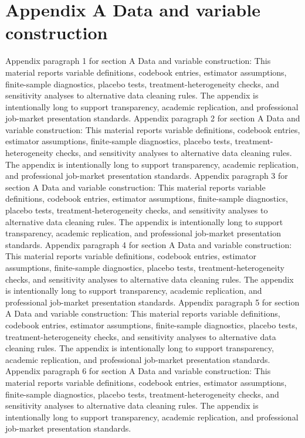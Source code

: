 \documentclass[preprint,12pt]{elsarticle}
\begin{document}
\section{Appendix A Data and variable construction}
Appendix paragraph 1 for section A Data and variable construction: This material reports variable definitions, codebook entries, estimator assumptions, finite-sample diagnostics, placebo tests, treatment-heterogeneity checks, and sensitivity analyses to alternative data cleaning rules. The appendix is intentionally long to support transparency, academic replication, and professional job-market presentation standards.
Appendix paragraph 2 for section A Data and variable construction: This material reports variable definitions, codebook entries, estimator assumptions, finite-sample diagnostics, placebo tests, treatment-heterogeneity checks, and sensitivity analyses to alternative data cleaning rules. The appendix is intentionally long to support transparency, academic replication, and professional job-market presentation standards.
Appendix paragraph 3 for section A Data and variable construction: This material reports variable definitions, codebook entries, estimator assumptions, finite-sample diagnostics, placebo tests, treatment-heterogeneity checks, and sensitivity analyses to alternative data cleaning rules. The appendix is intentionally long to support transparency, academic replication, and professional job-market presentation standards.
Appendix paragraph 4 for section A Data and variable construction: This material reports variable definitions, codebook entries, estimator assumptions, finite-sample diagnostics, placebo tests, treatment-heterogeneity checks, and sensitivity analyses to alternative data cleaning rules. The appendix is intentionally long to support transparency, academic replication, and professional job-market presentation standards.
Appendix paragraph 5 for section A Data and variable construction: This material reports variable definitions, codebook entries, estimator assumptions, finite-sample diagnostics, placebo tests, treatment-heterogeneity checks, and sensitivity analyses to alternative data cleaning rules. The appendix is intentionally long to support transparency, academic replication, and professional job-market presentation standards.
Appendix paragraph 6 for section A Data and variable construction: This material reports variable definitions, codebook entries, estimator assumptions, finite-sample diagnostics, placebo tests, treatment-heterogeneity checks, and sensitivity analyses to alternative data cleaning rules. The appendix is intentionally long to support transparency, academic replication, and professional job-market presentation standards.
\end{document}
